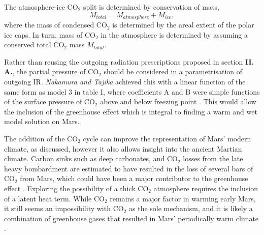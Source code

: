 \documentclass[12pt,onecolumn]{revtex4-2}    %
\begin{document}
The atmosphere-ice $\mathrm{CO_2}$ split is determined by conservation of mass, 
\begin{equation}
M_{total} = M_{atmosphere} + M_{ice},
\end{equation}
where the mass of condensed $\mathrm{CO_2}$ is determined by the areal extent of the polar ice caps. In turn, mass of $\mathrm{CO_2}$ in the atmosphere is determined by assuming a conserved total $\mathrm{CO_2}$ mass $M_{total}$.
\

Rather than reusing the outgoing radiation prescriptions proposed in section \textbf{II. A.}, the partial pressure of $\mathrm{CO_2}$ should be considered in a parametrisation of outgoing IR. \textit{Nakamura and Tajika} achieved this with a linear function of the same form as model 3 in table I, where coefficients A and B were simple functions of the surface pressure of $\mathrm{CO_2}$ above and below freezing point \cite{NT01}. This would allow the inclusion of the greenhouse effect which is integral to finding a warm and wet model solution on Mars.

The addition of the $\mathrm{CO_2}$ cycle can improve the representation of Mars' modern climate, as discussed, however it also allows insight into the ancient Martian climate. Carbon sinks such as deep carbonates, and $\mathrm{CO_2}$ losses from the late heavy bombardment are estimated to have resulted in the loss of several bars of $\mathrm{CO_2}$ from Mars, which could have been a major contributor to the greenhouse effect \cite{J19}. Exploring the possibility of a thick $\mathrm{CO_2}$ atmosphere requires the inclusion of a latent heat term. While $\mathrm{CO_2}$ remains a major factor in warming early Mars, it still seems an impossibility with $\mathrm{CO_2}$ as the sole mechanism, and it is likely a combination of greenhouse gases that resulted in Mars' periodically warm climate \cite{W16}.
\end{document}
